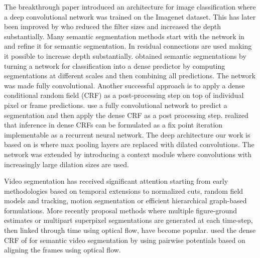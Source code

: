 \documentclass[10pt,twocolumn,letterpaper]{article}
\begin{document}
The breakthrough paper \cite{krizhevsky2012imagenet} introduced an architecture for image classification  where a deep convolutional network was trained on the Imagenet dataset. This has later been improved by \cite{simonyan2014very} who reduced the filter sizes and increased the depth substantially. Many semantic segmentation methods start with the network in \cite{simonyan2014very} and refine it for semantic segmentation. In \cite{he2015deep} residual connections are used making it possible to increase depth substantially. \cite{long2015fully} obtained semantic segmentations by turning a network for classification \cite{simonyan2014very} into a dense predictor by computing segmentations at different scales and then combining all predictions. The network was made fully convolutional. Another successful approach is to apply a dense conditional random field (CRF) \cite{krahenbuhl2011efficient} as a post-processing step on top of individual pixel or frame predictions. \cite{chen2014semantic} use a fully convolutional network to predict a segmentation and then apply the dense CRF as a post processing step. \cite{zheng2015conditional} realized that inference in dense CRFs can be formulated as a fix point iteration implementable as a recurrent neural network. The deep architecture our work is based on is \cite{yu2015multi} where max pooling layers are replaced with dilated convolutions. The network was extended by introducing a context module where convolutions with increasingly large dilation sizes are used.

Video segmentation has received significant attention starting from early methodologies based on temporal extensions to normalized cuts\cite{Shi:2000:NCI:351581.351611}, random field models and tracking\cite{rehg2012,lezama11}, motion segmentation\cite{DBLP:journals/pami/OchsMB14} or efficient hierarchical graph-based formulations\cite{grundman36247,XuXiCoECCV2012}. More recently proposal methods where multiple figure-ground estimates or multipart superpixel segmentations are generated at each time-step, then linked through time using optical flow\cite{li2013video,bais13iccv,Papazoglou:2013:FOS:2586117.2587271}, have become popular. \cite{kundu2016feature} used the dense CRF of \cite{krahenbuhl2011efficient} for semantic video segmentation by using pairwise potentials based on aligning the frames using optical flow.
\end{document}
